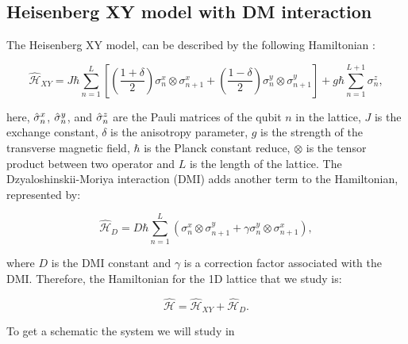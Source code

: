 \newpage


\subsection{Heisenberg XY model with DM interaction}
The Heisenberg XY model, can be described by the following Hamiltonian :


\begin{equation}
	\mathcal{\hat{H}}_{XY} = J \hbar \sum_{n=1}^L \left[ \left( \frac{1 + \delta}{2} \right) \sigma^x_n \otimes \sigma^x_{n+1} + \left( \frac{1 - \delta}{2} \right) \sigma^y_n \otimes \sigma^y_{n+1} \right] + g \hbar \sum_{n=1}^{L+1} \sigma^z_n,
\end{equation}

here, \( \hat{\sigma}_{n}^x\), \(\hat{\sigma}_{n}^y\), and \(\hat{\sigma}_{n}^z\) are the Pauli matrices of the qubit $n$ in the lattice, 
\(J\) is the exchange constant, \(\delta\) is the anisotropy parameter, 
\(g\) is the strength of the transverse magnetic field, 
$\hbar$ is the Planck constant reduce,
$\otimes $ is the tensor product between two operator and 
\(L\) is the length of the lattice. The Dzyaloshinskii-Moriya interaction (DMI) adds another term to the Hamiltonian, represented by:


\begin{equation}
	\mathcal{\hat{H}}_{D} = D\hbar \sum_{n=1}^L \left( \sigma^x_n \otimes \sigma^y_{n+1} + \gamma \sigma^y_n \otimes \sigma^x_{n+1} \right),
\end{equation}

where \(D\) is the DMI constant and \(\gamma\) is a correction factor associated with the DMI.
Therefore, the Hamiltonian for the 1D lattice that we study is:


\begin{equation}
	\mathcal{\hat{H}} = \mathcal{\hat{H}}_{XY} + \mathcal{\hat{H}}_{D}.
\end{equation}

To get a schematic the system we will study in 



